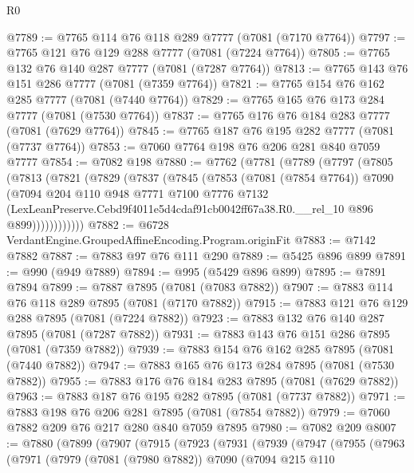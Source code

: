 \begin{lexlean}{R0}
\begin{coremodule}
@7789 := @7765 @114 @76 @118 @289 @7777 (@7081 (@7170 @7764))
@7797 := @7765 @121 @76 @129 @288 @7777 (@7081 (@7224 @7764))
@7805 := @7765 @132 @76 @140 @287 @7777 (@7081 (@7287 @7764))
@7813 := @7765 @143 @76 @151 @286 @7777 (@7081 (@7359 @7764))
@7821 := @7765 @154 @76 @162 @285 @7777 (@7081 (@7440 @7764))
@7829 := @7765 @165 @76 @173 @284 @7777 (@7081 (@7530 @7764))
@7837 := @7765 @176 @76 @184 @283 @7777 (@7081 (@7629 @7764))
@7845 := @7765 @187 @76 @195 @282 @7777 (@7081 (@7737 @7764))
@7853 := @7060 @7764 @198 @76 @206 @281 @840 @7059 @7777
@7854 := @7082 @198
@7880 := @7762
    (@7781
      (@7789
        (@7797
          (@7805
            (@7813
              (@7821
                (@7829
                  (@7837
                    (@7845
                      (@7853
                        (@7081 (@7854 @7764))
                        @7090
                        (@7094
                          @204
                          @110
                          @948
                          @7771
                          @7100
                          @7776
                          @7132
                          (LexLeanPreserve.Cebd9f4011e5d4cdaf91cb0042ff67a38.R0.__rel_10
                            @896
                            @899))))))))))))
@7882 := @6728 VerdantEngine.GroupedAffineEncoding.Program.originFit
@7883 := @7142 @7882
@7887 := @7883 @97 @76 @111 @290
@7889 := @5425 @896 @899
@7891 := @990 (@949 @7889)
@7894 := @995 (@5429 @896 @899)
@7895 := @7891 @7894
@7899 := @7887 @7895 (@7081 (@7083 @7882))
@7907 := @7883 @114 @76 @118 @289 @7895 (@7081 (@7170 @7882))
@7915 := @7883 @121 @76 @129 @288 @7895 (@7081 (@7224 @7882))
@7923 := @7883 @132 @76 @140 @287 @7895 (@7081 (@7287 @7882))
@7931 := @7883 @143 @76 @151 @286 @7895 (@7081 (@7359 @7882))
@7939 := @7883 @154 @76 @162 @285 @7895 (@7081 (@7440 @7882))
@7947 := @7883 @165 @76 @173 @284 @7895 (@7081 (@7530 @7882))
@7955 := @7883 @176 @76 @184 @283 @7895 (@7081 (@7629 @7882))
@7963 := @7883 @187 @76 @195 @282 @7895 (@7081 (@7737 @7882))
@7971 := @7883 @198 @76 @206 @281 @7895 (@7081 (@7854 @7882))
@7979 := @7060 @7882 @209 @76 @217 @280 @840 @7059 @7895
@7980 := @7082 @209
@8007 := @7880
    (@7899
      (@7907
        (@7915
          (@7923
            (@7931
              (@7939
                (@7947
                  (@7955
                    (@7963
                      (@7971
                        (@7979
                          (@7081 (@7980 @7882))
                          @7090
                          (@7094
                            @215
                            @110

\end{coremodule}
\end{lexlean}
